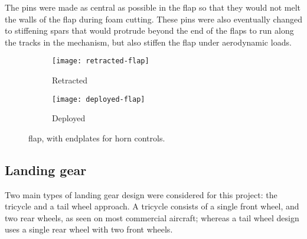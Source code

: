 \documentclass[../../main.tex]{subfiles}
\begin{document}

The pins were made as central as possible in the flap so that they would not melt the walls of the flap during foam cutting.
These pins were also eventually changed to stiffening spars that would protrude beyond the end of the flaps to run along the tracks in the mechanism, but also stiffen the flap under aerodynamic loads.


\begin{figure}[H]

    \centering
    \begin{subfigure}[b]{0.49\columnwidth}
        \centering
        \texttt{[image: retracted-flap]}
        \caption{Retracted}
        \label{fig:flaps:retracted}
    \end{subfigure}
    \hfill
    \begin{subfigure}[b]{0.49\columnwidth}
        \centering
        \texttt{[image: deployed-flap]}
        \caption{Deployed}
        \label{fig:flaps:deployed}
    \end{subfigure}
    
    \caption{flap, with endplates for horn controls.}
    \label{fig:flaps}
\end{figure}

\subsection{Landing gear} \label{sec:design-process:design-revision:landing-gear}

Two main types of landing gear design were considered for this project: the tricycle and a tail wheel approach.
A tricycle consists of a single front wheel, and two rear wheels, as seen on most commercial aircraft; whereas a tail wheel design uses a single rear wheel with two front wheels.

\end{document}
